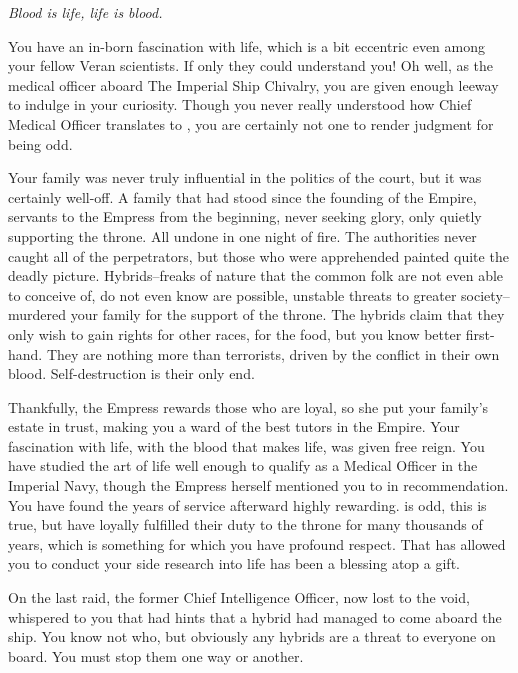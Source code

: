 \documentclass[char]{guildcamp4}
\begin{document}
\name{\cVthree{}}

\textit{Blood is life, life is blood.}

You have an in-born fascination with life, which is a bit eccentric even among your fellow Veran scientists. If only they could understand you! Oh well, as the medical officer aboard The Imperial Ship Chivalry, you are given enough leeway to indulge in your curiosity. Though you never really understood how Chief Medical Officer translates to \cVthree{\Baron}, you are certainly not one to render judgment for being odd.

Your family was never truly influential in the politics of the court, but it was certainly well-off. A family that had stood since the founding of the Empire, servants to the Empress from the beginning, never seeking glory, only quietly supporting the throne. All undone in one night of fire. The authorities never caught all of the perpetrators, but those who were apprehended painted quite the deadly picture. Hybrids--freaks of nature that the common folk are not even able to conceive of, do not even know are possible, unstable threats to greater society--murdered your family for the support of the throne. The hybrids claim that they only wish to gain rights for other races, for the food, but you know better first-hand. They are nothing more than terrorists, driven by the conflict in their own blood. Self-destruction is their only end. 

Thankfully, the Empress rewards those who are loyal, so she put your family's estate in trust, making you a ward of the best tutors in the Empire. Your fascination with life, with the blood that makes life, was given free reign. You have studied the art of life well enough to qualify as a Medical Officer in the Imperial Navy, though the Empress herself mentioned you to \cVone{} in recommendation. You have found the years of service afterward highly rewarding. \cVone{} is odd, this is true, but \cVone{\they} have loyally fulfilled their duty to the throne for many thousands of years, which is something for which you have profound respect. That \cVone{} has allowed you to conduct your side research into life has been a blessing atop a gift. 

On the last raid, the former Chief Intelligence Officer, now lost to the void, whispered to you that \cIntel{\they} had hints that a hybrid had managed to come aboard the ship. You know not who, but obviously any hybrids are a threat to everyone on board. You must stop them one way or another.
\end{document}
